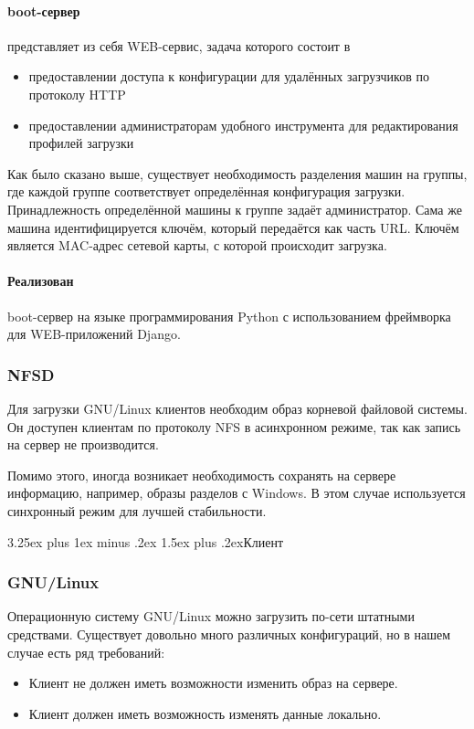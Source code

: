 \documentclass[11pt]{article}
\makeatletter
\renewcommand{\subsection}{\@startsection{subsection}{2}%
{\parindent}{3.25ex plus 1ex minus .2ex}%
{1.5ex plus .2ex}{\bfseries}}
\makeatother
\begin{document}
\paragraph{boot-сервер} представляет из себя WEB-сервис, задача которого состоит в
\begin{itemize}
    \item предоставлении доступа к конфигурации для удалённых загрузчиков по протоколу HTTP
    \item предоставлении администраторам удобного инструмента для редактирования профилей загрузки
\end{itemize}

Как было сказано выше, существует необходимость разделения машин на группы,
где каждой группе соответствует определённая конфигурация загрузки. Принадлежность
определённой машины к группе задаёт администратор. Сама же машина идентифицируется ключём,
который передаётся как часть URL. Ключём является MAC-адрес сетевой карты, с которой
происходит загрузка.

\paragraph{Реализован} boot-сервер на языке программирования Python
с использованием фреймворка для WEB-приложений Django.

\subsubsection{NFSD}
Для загрузки GNU/Linux клиентов необходим образ
корневой файловой системы. Он доступен клиентам
по протоколу NFS в асинхронном режиме, так как
запись на сервер не производится.

Помимо этого, иногда возникает необходимость
сохранять на сервере информацию, например, образы
разделов с Windows. В этом случае используется
синхронный режим для лучшей стабильности.

\subsection{Клиент}

\subsubsection{GNU/Linux}
Операционную систему GNU/Linux можно загрузить по-сети
штатными средствами. Существует довольно много различных
конфигураций, но в нашем случае есть ряд требований:
\begin{itemize}
    \item Клиент не должен иметь возможности изменить образ на сервере.
    \item Клиент должен иметь возможность изменять данные локально.
\end{itemize}
\end{document}
